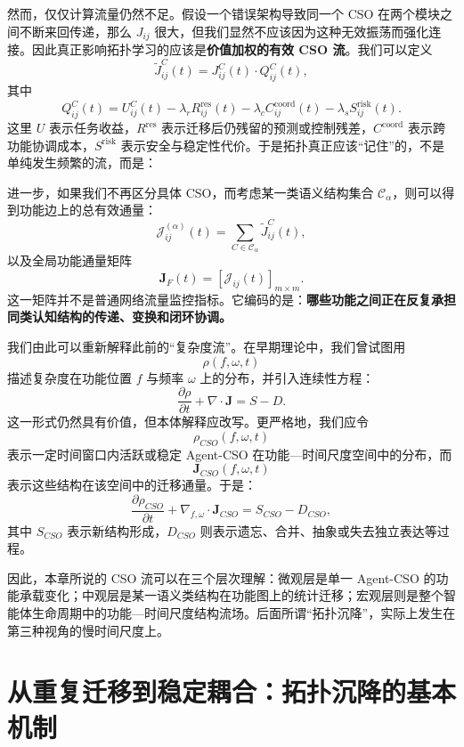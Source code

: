 然而，仅仅计算流量仍然不足。假设一个错误架构导致同一个 CSO 在两个模块之间不断来回传递，那么 $J_{ij}$ 很大，但我们显然不应该因为这种无效振荡而强化连接。因此真正影响拓扑学习的应该是\textbf{价值加权的有效 CSO 流}。我们可以定义
\[
\widetilde{J}_{ij}^{C}(t)
=
J_{ij}^{C}(t)
\cdot
Q_{ij}^{C}(t),
\]
其中
\[
Q_{ij}^{C}(t)
=
U_{ij}^{C}(t)
-
\lambda_r R_{ij}^{\mathrm{res}}(t)
-
\lambda_c C_{ij}^{\mathrm{coord}}(t)
-
\lambda_s S_{ij}^{\mathrm{risk}}(t).
\]
这里 $U$ 表示任务收益，$R^{\mathrm{res}}$ 表示迁移后仍残留的预测或控制残差，$C^{\mathrm{coord}}$ 表示跨功能协调成本，$S^{\mathrm{risk}}$ 表示安全与稳定性代价。于是拓扑真正应该``记住''的，不是单纯发生频繁的流，而是：
\begin{statementbox}
\centering
{}
\end{statementbox}

进一步，如果我们不再区分具体 CSO，而考虑某一类语义结构集合 $\mathcal{C}_{\alpha}$，则可以得到功能边上的总有效通量：
\[
\mathcal{J}_{ij}^{(\alpha)}(t)
=
\sum_{C\in\mathcal{C}_{\alpha}}
\widetilde{J}_{ij}^{C}(t),
\]
以及全局功能通量矩阵
\[
\mathbf{J}_{F}(t)
=
\left[
\mathcal{J}_{ij}(t)
\right]_{m\times m}.
\]
这一矩阵并不是普通网络流量监控指标。它编码的是：\textbf{哪些功能之间正在反复承担同类认知结构的传递、变换和闭环协调。}

我们由此可以重新解释此前的``复杂度流''。在早期理论中，我们曾试图用
\[
\rho(f,\omega,t)
\]
描述复杂度在功能位置 $f$ 与频率 $\omega$ 上的分布，并引入连续性方程：
\[
\frac{\partial\rho}{\partial t}
+
\nabla\cdot\mathbf{J}
=
S-D.
\]
这一形式仍然具有价值，但本体解释应改写。更严格地，我们应令
\[
\rho_{CSO}(f,\omega,t)
\]
表示一定时间窗口内活跃或稳定 Agent-CSO 在功能—时间尺度空间中的分布，而
\[
\mathbf{J}_{CSO}(f,\omega,t)
\]
表示这些结构在该空间中的迁移通量。于是：
\[
\frac{\partial\rho_{CSO}}{\partial t}
+
\nabla_{f,\omega}\cdot
\mathbf{J}_{CSO}
=
S_{CSO}-D_{CSO},
\]
其中 $S_{CSO}$ 表示新结构形成，$D_{CSO}$ 则表示遗忘、合并、抽象或失去独立表达等过程。

因此，本章所说的 CSO 流可以在三个层次理解：微观层是单一 Agent-CSO 的功能承载变化；中观层是某一语义类结构在功能图上的统计迁移；宏观层则是整个智能体生命周期中的功能—时间尺度结构流场。后面所谓``拓扑沉降''，实际上发生在第三种视角的慢时间尺度上。


\section{从重复迁移到稳定耦合：拓扑沉降的基本机制}

